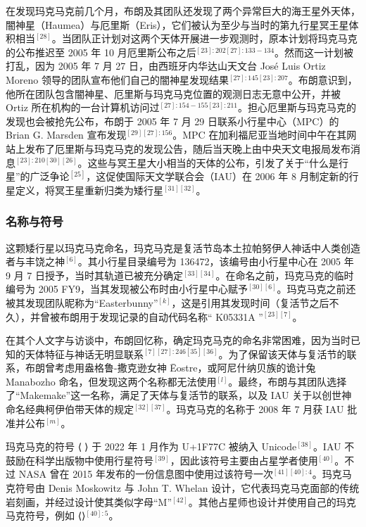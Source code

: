 在发现玛克马克前几个月，布朗及其团队还发现了两个异常巨大的海王星外天体，闇神星（Haumea）与厄里斯（Eris），它们被认为至少与当时的第九行星冥王星体积相当$^{[28]}$。当团队正计划对这两个天体开展进一步观测时，原本计划将玛克马克的公布推迟至 2005 年 10 月厄里斯公布之后$^{[23]:202[27]:133-134}$。然而这一计划被打乱，因为 2005 年 7 月 27 日，由西班牙内华达山天文台 José Luis Ortiz Moreno 领导的团队宣布他们自己的闇神星发现结果$^{[27]:145[23]:207}$。布朗意识到，他所在团队包含闇神星、厄里斯与玛克马克位置的观测日志无意中公开，并被 Ortiz 所在机构的一台计算机访问过$^{[27]:154-155[23]:211}$。担心厄里斯与玛克马克的发现也会被抢先公布，布朗于 2005 年 7 月 29 日联系小行星中心（MPC）的 Brian G. Marsden 宣布发现$^{[29][27]:156}$。MPC 在加利福尼亚当地时间中午在其网站上发布了厄里斯与玛克马克的发现公告，随后当天晚上由中央天文电报局发布消息$^{[23]:210[30][26]}$。这些与冥王星大小相当的天体的公布，引发了关于“什么是行星”的广泛争论$^{[25]}$，这促使国际天文学联合会（IAU）在 2006 年 8 月制定新的行星定义，将冥王星重新归类为矮行星$^{[31][32]}$。
\subsubsection{名称与符号}
这颗矮行星以玛克马克命名，玛克马克是复活节岛本土拉帕努伊人神话中人类创造者与丰饶之神$^{[6]}$。其小行星目录编号为 136472，该编号由小行星中心在 2005 年 9 月 7 日授予，当时其轨道已被充分确定$^{[33][34]}$。在命名之前，玛克马克的临时编号为 2005 FY9，当其发现被公布时由小行星中心赋予$^{[30][6]}$。玛克马克之前还被其发现团队昵称为“Easterbunny”$^{[k]}$，这是引用其发现时间（复活节之后不久），并曾被布朗用于发现记录的自动代码名称“ K05331A ”$^{[23][7]}$。

在其个人文字与访谈中，布朗回忆称，确定玛克马克的命名非常困难，因为当时已知的天体特征与神话无明显联系$^{[7][27]:246[35][36]}$。为了保留该天体与复活节的联系，布朗曾考虑用盎格鲁-撒克逊女神 Ēostre，或阿尼什纳贝族的诡计兔 Manabozho 命名，但发现这两个名称都无法使用$^{[l]}$。最终，布朗与其团队选择了“Makemake”这一名称，满足了天体与复活节的联系，以及 IAU 关于以创世神命名经典柯伊伯带天体的规定$^{[32][37]}$。玛克马克的名称于 2008 年 7 月获 IAU 批准并公布$^{[m]}$。

玛克马克的符号 ⟨🝼⟩ 于 2022 年 1 月作为 U+1F77C 被纳入 Unicode$^{[38]}$。IAU 不鼓励在科学出版物中使用行星符号$^{[39]}$，因此该符号主要由占星学者使用$^{[40]}$。不过 NASA 曾在 2015 年发布的一份信息图中使用过该符号一次$^{[41][40]:4}$。玛克马克符号由 Denis Moskowitz 与 John T. Whelan 设计，它代表玛克马克面部的传统岩刻画，并经过设计使其类似字母“M”$^{[42]}$。其他占星师也设计并使用自己的玛克马克符号，例如 ⟨⟩$^{[40]:5}$。
